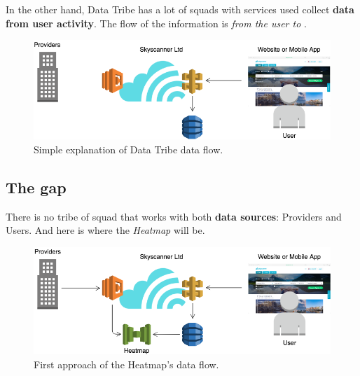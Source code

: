 In the other hand, Data Tribe has a lot of squads with services used collect \textbf{data from user activity}. The flow of the information is \textit{from the user to \company}.

\begin{figure}[H]
\centering
\includegraphics[scale=0.45]{diagrams/state-of-the-art-tribes-data.png}
\caption{Simple explanation of Data Tribe data flow.}
\end{figure}

\subsection{The gap}

There is no tribe of squad that works with both \textbf{data sources}: Providers and Users. And here is where the \textit{Heatmap} will be.

\begin{figure}[H]
\centering
\includegraphics[scale=0.45]{diagrams/state-of-the-art-tribes-hm.png}
\caption{First approach of the Heatmap's data flow.}
\end{figure}

